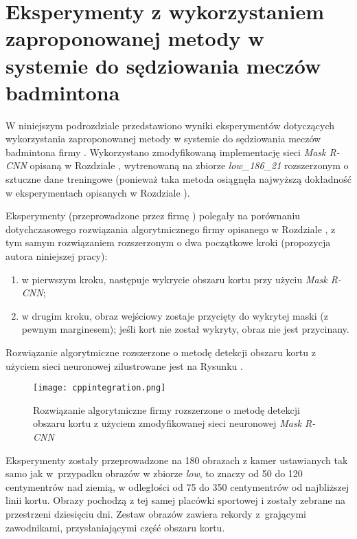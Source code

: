 \section{Eksperymenty z wykorzystaniem zaproponowanej metody w systemie do sędziowania meczów badmintona}
\label{sec:integrationblue}

W niniejszym podrozdziale przedstawiono wyniki eksperymentów dotyczących wykorzystania zaproponowanej metody w systemie do sędziowania meczów badmintona firmy \blue{}.
Wykorzystano zmodyfikowaną implementację sieci \textit{Mask R-CNN} opisaną w Rozdziale , wytrenowaną na zbiorze \textit{low\_186\_21} rozszerzonym o sztuczne dane treningowe (ponieważ taka metoda osiągnęła najwyższą dokładność w eksperymentach opisanych w Rozdziale ).

Eksperymenty (przeprowadzone przez firmę \blue{}) polegały na porównaniu dotychczasowego rozwiązania algorytmicznego firmy \blue{} opisanego w Rozdziale , z tym samym rozwiązaniem rozszerzonym o dwa początkowe kroki (propozycja autora niniejszej pracy):

\begin{enumerate}
  \item w pierwszym kroku, następuje wykrycie obszaru kortu przy użyciu \textit{Mask R-CNN};
  \item w drugim kroku, obraz wejściowy zostaje przycięty do wykrytej maski (z pewnym marginesem); jeśli kort nie został wykryty, obraz nie jest przycinany.
\end{enumerate}

Rozwiązanie algorytmiczne rozszerzone o metodę detekcji obszaru kortu z użyciem sieci neuronowej zilustrowane jest na Rysunku .

\begin{figure}[h]
  \centering
  \texttt{[image: cppintegration.png]}
  \caption{Rozwiązanie algorytmiczne firmy \blue{} rozszerzone o metodę detekcji obszaru kortu z użyciem zmodyfikowanej sieci neuronowej \textit{Mask R-CNN}}
  \label{fig:cppintegration}
\end{figure}

Eksperymenty zostały przeprowadzone na 180 obrazach z kamer ustawianych tak samo jak w~przypadku obrazów w zbiorze \textit{low}, to znaczy od 50 do 120 centymentrów nad ziemią, w odległości od 75 do 350 centymentrów od najbliższej linii kortu. Obrazy pochodzą z tej samej placówki sportowej i zostały zebrane na przestrzeni dziesięciu dni. Zestaw obrazów zawiera rekordy z~grającymi zawodnikami, przysłaniającymi część obszaru kortu.

